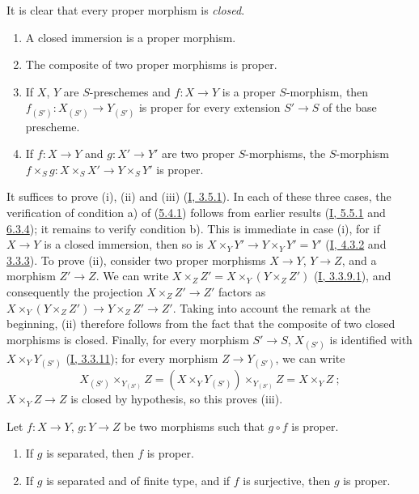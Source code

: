 It is clear that every proper morphism is \emph{closed}.

\begin{proposition}[5.4.2]
\label{II.5.4.2}
\begin{enumerate}
  \item[\rm{(i)}] A closed immersion is a proper morphism.
  \item[\rm{(ii)}] The composite of two proper morphisms is proper.
  \item[\rm{(iii)}] If $X$, $Y$ are $S$-preschemes and
  $f:X\to Y$ is a proper $S$-morphism, then
  $f_{(S')}:X_{(S')}\to Y_{(S')}$ is proper for every extension
  $S'\to S$ of the base prescheme.
  \item[\rm{(iv)}] If $f:X\to Y$ and $g:X'\to Y'$ are two proper
  $S$-morphisms, the $S$-morphism
  $f\times_Sg:X\times_SX'\to Y\times_SY'$ is proper.
\end{enumerate}
\end{proposition}


It suffices to prove (i), (ii) and (iii) (\hyperref[I.3.5.1]{I, 3.5.1}).
In each of these three cases, the verification of condition a) of
(\hyperref[II.5.4.1]{5.4.1}) follows from earlier results
(\hyperref[I.5.5.1]{I, 5.5.1} and \hyperref[I.6.3.4]{6.3.4}); it remains to
verify condition b). This is immediate in case (i), for if $X\to Y$
is a closed immersion, then so is
$X\times_YY'\to Y\times_YY'=Y'$ (\hyperref[I.4.3.2]{I, 4.3.2} and
\hyperref[II.3.3.3]{3.3.3}). To prove (ii), consider two
proper morphisms $X\to Y$, $Y\to Z$, and a morphism $Z'\to Z$. We can
write $X\times_ZZ'=X\times_Y(Y\times_ZZ')$
(\hyperref[I.3.3.9.1]{I, 3.3.9.1}), and consequently the projection
$X\times_ZZ'\to Z'$ factors as
$X\times_Y(Y\times_ZZ')\to Y\times_ZZ'\to Z'$. Taking into account the remark
at the beginning, (ii) therefore follows from the fact that the composite of
two closed morphisms is closed. Finally, for every morphism $S'\to S$,
$X_{(S')}$ is identified with
$X\times_YY_{(S')}$ (\hyperref[I.3.3.11]{I, 3.3.11}); for every
morphism $Z\to Y_{(S')}$, we can write
\[
  X_{(S')}\times_{Y_{(S')}}Z
  =(X\times_YY_{(S')})\times_{Y_{(S')}}Z=X\times_YZ~;
\]
$X\times_YZ\to Z$ is closed by hypothesis, so this proves (iii).

\begin{corollary}[5.4.3]
\label{II.5.4.3}
Let $f:X\to Y$, $g:Y\to Z$ be two morphisms such that $g\circ f$ is
proper.
\begin{enumerate}
  \item[\rm{(i)}] If $g$ is separated, then $f$ is proper.
  \item[\rm{(ii)}] If $g$ is separated and of finite type, and if $f$ is
  surjective, then $g$ is proper.
\end{enumerate}
\end{corollary}

